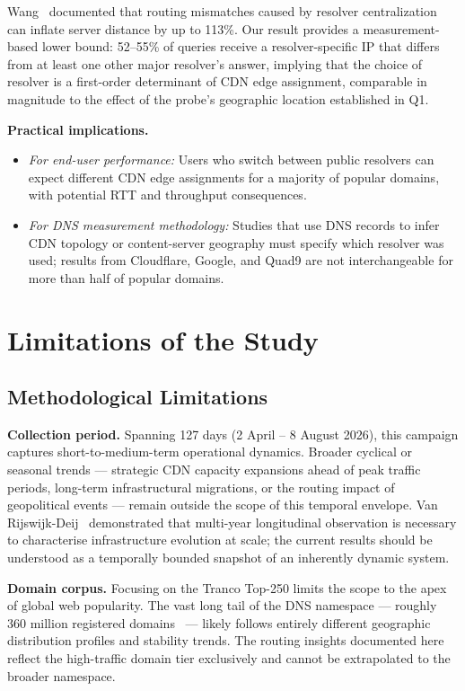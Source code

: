 Wang~\cite{Wang2018} documented that routing mismatches caused by resolver centralization can inflate server distance by up to 113\%. Our result provides a measurement-based lower bound: 52--55\% of queries receive a resolver-specific \ac{IP} that differs from at least one other major resolver's answer, implying that the choice of resolver is a first-order determinant of \ac{CDN} edge assignment, comparable in magnitude to the effect of the probe's geographic location established in Q1.

\textbf{Practical implications.}
\begin{itemize}
  \item \textit{For end-user performance:} Users who switch between public resolvers can expect different \ac{CDN} edge assignments for a majority of popular domains, with potential \ac{RTT} and throughput consequences.
  \item \textit{For \ac{DNS} measurement methodology:} Studies that use \ac{DNS} records to infer \ac{CDN} topology or content-server geography must specify which resolver was used; results from Cloudflare, Google, and Quad9 are not interchangeable for more than half of popular domains.
\end{itemize}

\bigskip
\section{Limitations of the Study}
\label{sec:5.2}

\bigskip
\subsection{Methodological Limitations}
\label{subsec:5.2.1}

\textbf{Collection period.} Spanning 127 days (2 April -- 8 August 2026), this campaign captures short-to-medium-term operational dynamics. Broader cyclical or seasonal trends --- strategic \ac{CDN} capacity expansions ahead of peak traffic periods, long-term infrastructural migrations, or the routing impact of geopolitical events --- remain outside the scope of this temporal envelope. Van Rijswijk-Deij~\cite{vanRijswijk2016} demonstrated that multi-year longitudinal observation is necessary to characterise infrastructure evolution at scale; the current results should be understood as a temporally bounded snapshot of an inherently dynamic system.

\textbf{Domain corpus.} Focusing on the Tranco Top-250 limits the scope to the apex of global web popularity. The vast long tail of the \ac{DNS} namespace --- roughly 360 million registered domains~\cite{vanRijswijk2016} --- likely follows entirely different geographic distribution profiles and stability trends. The routing insights documented here reflect the high-traffic domain tier exclusively and cannot be extrapolated to the broader namespace.


